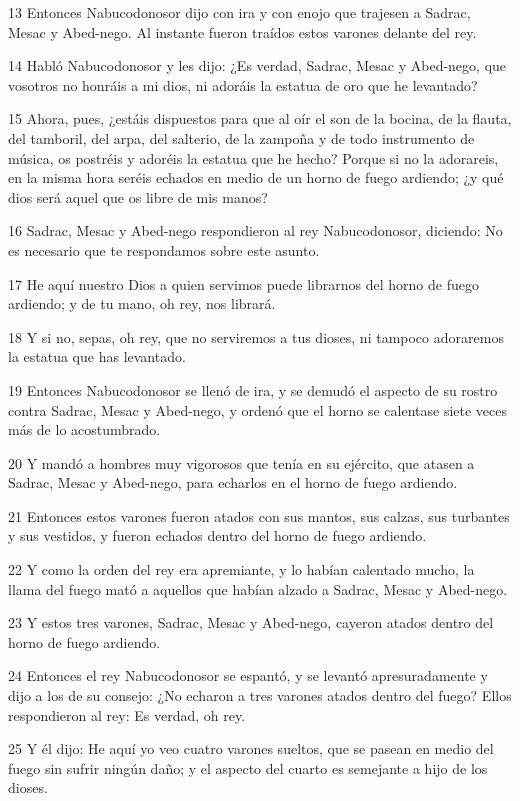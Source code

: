 \par 13 Entonces Nabucodonosor dijo con ira y con enojo que trajesen a Sadrac, Mesac y Abed-nego. Al instante fueron traídos estos varones delante del rey.
\par 14 Habló Nabucodonosor y les dijo: ¿Es verdad, Sadrac, Mesac y Abed-nego, que vosotros no honráis a mi dios, ni adoráis la estatua de oro que he levantado?
\par 15 Ahora, pues, ¿estáis dispuestos para que al oír el son de la bocina, de la flauta, del tamboril, del arpa, del salterio, de la zampoña y de todo instrumento de música, os postréis y adoréis la estatua que he hecho? Porque si no la adorareis, en la misma hora seréis echados en medio de un horno de fuego ardiendo; ¿y qué dios será aquel que os libre de mis manos?
\par 16 Sadrac, Mesac y Abed-nego respondieron al rey Nabucodonosor, diciendo: No es necesario que te respondamos sobre este asunto.
\par 17 He aquí nuestro Dios a quien servimos puede librarnos del horno de fuego ardiendo; y de tu mano, oh rey, nos librará.
\par 18 Y si no, sepas, oh rey, que no serviremos a tus dioses, ni tampoco adoraremos la estatua que has levantado.
\par 19 Entonces Nabucodonosor se llenó de ira, y se demudó el aspecto de su rostro contra Sadrac, Mesac y Abed-nego, y ordenó que el horno se calentase siete veces más de lo acostumbrado.
\par 20 Y mandó a hombres muy vigorosos que tenía en su ejército, que atasen a Sadrac, Mesac y Abed-nego, para echarlos en el horno de fuego ardiendo.
\par 21 Entonces estos varones fueron atados con sus mantos, sus calzas, sus turbantes y sus vestidos, y fueron echados dentro del horno de fuego ardiendo.
\par 22 Y como la orden del rey era apremiante, y lo habían calentado mucho, la llama del fuego mató a aquellos que habían alzado a Sadrac, Mesac y Abed-nego.
\par 23 Y estos tres varones, Sadrac, Mesac y Abed-nego, cayeron atados dentro del horno de fuego ardiendo.
\par 24 Entonces el rey Nabucodonosor se espantó, y se levantó apresuradamente y dijo a los de su consejo: ¿No echaron a tres varones atados dentro del fuego? Ellos respondieron al rey: Es verdad, oh rey.
\par 25 Y él dijo: He aquí yo veo cuatro varones sueltos, que se pasean en medio del fuego sin sufrir ningún daño; y el aspecto del cuarto es semejante a hijo de los dioses.
